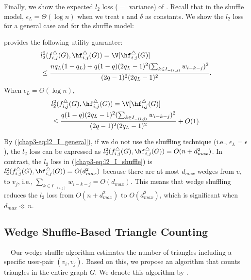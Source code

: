Finally, we show the expected $l_2$ loss ($=$ variance) of \AlgWS{}. 
Recall that in the shuffle model, $\epsilon_L = \Theta(\log n)$ when we treat $\epsilon$ and $\delta$ as constants. 
We show 
the $l_2$ loss for a general case and for the shuffle model:
\begin{theorem}
\label{chap3-thm:l2-loss_I}
\AlgWS{} provides the following utility guarantee: 
\begin{align}
& l_2^2(f_{i,j}^\triangle(G), \hf_{i,j}^\triangle(G)) = \V[\hf_{i,j}^\triangle(G)] \nonumber\\ 
& \leq \frac{n q_L(1-q_L) + q(1-q)(2q_L-1)^2 (\sum_{k \in I_{-(i,j)}}w_{i-k-j})^2}{(2q-1)^2(2q_L-1)^2}.
\label{chap3-eq:l2_I_general}
\end{align}
When $\epsilon_L = \Theta(\log n)$, 
\begin{align}
& l_2^2(f_{i,j}^\triangle(G), \hf_{i,j}^\triangle(G)) = \V[\hf_{i,j}^\triangle(G)] \nonumber\\ 
& \leq \frac{q(1-q)(2q_L-1)^2 (\sum_{k \in I_{-(i,j)}}w_{i-k-j})^2}{(2q-1)^2(2q_L-1)^2} + O(1).
\label{chap3-eq:l2_I_shuffle}
\end{align}
\end{theorem}
By (\ref{chap3-eq:l2_I_general}), if we do not use the shuffling technique (i.e., $\epsilon_L = \epsilon$), the $l_2$ loss can be expressed as $l_2^2(f_{i,j}^\triangle(G), \hf_{i,j}^\triangle(G)) = O(n + d_{max}^2)$. 
In contrast, the $l_2$ loss in (\ref{chap3-eq:l2_I_shuffle}) is $l_2^2(f_{i,j}^\triangle(G), \hf_{i,j}^\triangle(G)) = O(d_{max}^2)$ because there are at most $d_{max}$ wedges from $v_i$ to $v_j$, i.e., $\sum_{k \in I_{-(i,j)}}w_{i-k-j} = O(d_{max})$. 
This means that wedge shuffling reduces the $l_2$ loss from $O(n + d_{max}^2)$ to $O(d_{max}^2)$, which is significant when $d_{max} \ll n$. 

\subsection{Wedge Shuffle-Based Triangle Counting}
\label{chap3-sub:triangle}
~~Our wedge shuffle algorithm \AlgWS{} estimates the number of triangles including a specific user-pair $(v_i,v_j)$. 
Based on this, we propose an algorithm that 
counts triangles in the entire graph $G$. 
We denote this algorithm by \AlgWSTri{}. 

